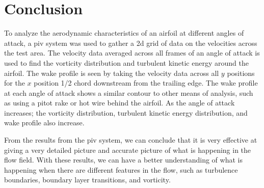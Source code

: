 \chapter{Conclusion}
\label{cp:conclusion}
To analyze the aerodynamic characteristics of an airfoil at different angles of attack, a \acrfull{piv} system was used to gather a 2d grid of data on the velocities across the test area. The velocity data averaged across all frames of an angle of attack is used to find the vorticity distribution and turbulent kinetic energy around the airfoil. The wake profile is seen by taking the velocity data across all $y$ positions for the $x$ position 1/2 chord downstream from the trailing edge. The wake profile at each angle of attack shows a similar contour to other means of analysis, such as using a pitot rake or hot wire behind the airfoil. As the angle of attack increases; the vorticity distribution, turbulent kinetic energy distribution, and wake profile also increase. 

From the results from the \acrshort{piv} system, we can conclude that it is very effective at giving a very detailed picture and accurate picture of what is happening in the flow field. With these results, we can have a better understanding of what is happening when there are different features in the flow, such as turbulence boundaries, boundary layer transitions, and vorticity.